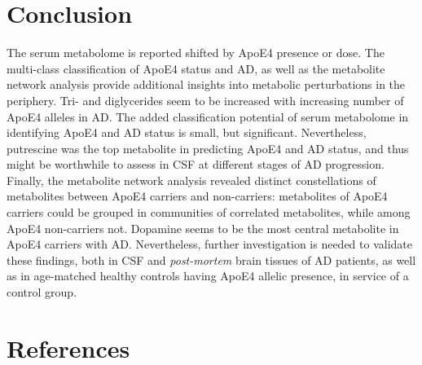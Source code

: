 \documentclass{amsart}
\begin{document}
\section{Conclusion} \label{concl}
The serum metabolome is reported shifted by ApoE4 presence or dose. The multi-class classification of ApoE4 status and AD, as well as the metabolite network analysis provide additional insights into metabolic perturbations in the periphery. Tri- and diglycerides seem to be increased with increasing number of ApoE4 alleles in AD. The added classification potential of serum metabolome in identifying ApoE4 and AD status is small, but significant. Nevertheless, putrescine was the top metabolite in predicting ApoE4 and AD status, and thus might be worthwhile to assess in CSF at different stages of AD progression. Finally, the metabolite network analysis revealed distinct constellations of metabolites between ApoE4 carriers and non-carriers: metabolites of ApoE4 carriers could be grouped in communities of correlated metabolites, while among ApoE4 non-carriers not. Dopamine seems to be the most central metabolite in ApoE4 carriers with AD. Nevertheless, further investigation is needed to validate these findings, both in CSF and \textit{post-mortem} brain tissues of AD patients, as well as in age-matched healthy controls having ApoE4 allelic presence, in service of a control group. 


\newpage
\section*{References}
\printbibliography[heading=none]
\clearpage
\appendix 
\clearpage
\end{document}
